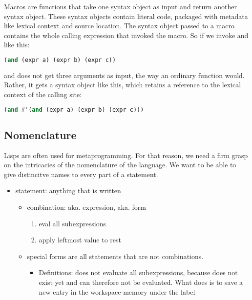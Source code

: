 Macros are func­tions that take one syntax object  as input and return another syntax object. These syntax objects contain literal code, pack­aged with meta­data like lexical context and source loca­tion.
The syntax object passed to a macro contains the whole calling expres­sion that invoked the macro. So if we invoke and like this:
\begin{lstlisting}[language=lisp]
(and (expr a) (expr b) (expr c))
\end{lstlisting}
and does not get three argu­ments as input, the way an ordi­nary func­tion would. Rather, it gets a syntax object like this, which retains a refer­ence to the lexical context of the calling site:
\begin{lstlisting}[language=lisp]
(and #'(and (expr a) (expr b) (expr c)))
\end{lstlisting}




\subsection{Nomenclature}

Lisps are often used for metaprogramming. For that reason, we need a firm grasp on the intricacies of the nomenclature of the language. We want to be able to give distincitve names to every part of a statement. 

\begin{itemize}
  \item statement: anything that is written 
  \begin{itemize}
    \item combination: aka. expression, aka. form 
    \begin{enumerate}
      \item eval all subexpressions
      \item apply leftmost value to rest
    \end{enumerate}
  \item special forms are all statements that are not combinations. 
  \begin{itemize}
    \item Definitions:  does not evaluate all subexpressions, because  does not exist yet and can therefore not be evaluated. What  does is to save a new entry in the workspace-memory under the label 
  \end{itemize}
  \end{itemize}
\end{itemize}